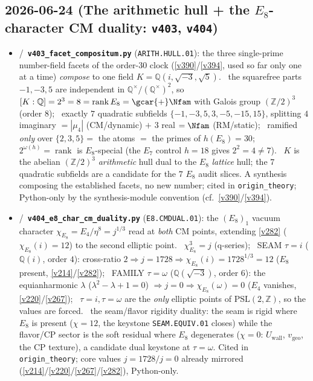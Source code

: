 \subsection*{2026-06-24 (The arithmetic hull + the $E_8$-character CM duality: \texttt{v403}, \texttt{v404})}
\begin{itemize}
\item \mE/\mC\ \textbf{\texttt{v403\_facet\_compositum.py}} (\texttt{ARITH.HULL.01}): the three single-prime number-field facets of the order-$30$ clock (\vref{v390}/\vref{v394}, used so far only one at a time) \emph{compose} to one field $K=\mathbb Q(i,\sqrt{-3},\sqrt5)$. \mE\ the squarefree parts $-1,-3,5$ are independent in $\mathbb Q^\times/(\mathbb Q^\times)^2$, so $[K:\mathbb Q]=2^3=8=\operatorname{rank}E_8=\gcar{+}\Nfam$ with Galois group $(\mathbb Z/2)^3$ (order $8$); \mE\ exactly $7$ quadratic subfields $\{-1,-3,5,3,-5,-15,15\}$, splitting $4$ imaginary $=|\mu_4|$ (CM/dynamic) $+$ $3$ real $=\Nfam$ (RM/static); \mE\ ramified \emph{only} over $\{2,3,5\}=$ the atoms $=$ the primes of $h(E_8)=30$; \mE\ $2^{\omega(h)}=\operatorname{rank}$ is $E_8$-special (the $E_7$ control $h=18$ gives $2^2=4\neq7$). \mC\ $K$ is the abelian $(\mathbb Z/2)^3$ \emph{arithmetic} hull dual to the $E_8$ \emph{lattice} hull; the $7$ quadratic subfields are a candidate for the $7$ $E_8$ audit slices. A synthesis composing the established facets, no new number; cited in \texttt{origin\_theory}; Python-only by the synthesis-module convention (cf.\ \vref{v390}/\vref{v394}).
\item \mE/\mC\ \textbf{\texttt{v404\_e8\_char\_cm\_duality.py}} (\texttt{E8.CMDUAL.01}): the $(E_8)_1$ vacuum character $\chi_{E_8}=E_4/\eta^8=j^{1/3}$ read at \emph{both} CM points, extending \vref{v282} ($\chi_{E_8}(i)=12$) to the second elliptic point. \mE\ $\chi_{E_8}^3=j$ (q-series); \mE\ SEAM $\tau{=}i$ ($\mathbb Q(i)$, order $4$): cross-ratio $2\Rightarrow j=1728\Rightarrow\chi_{E_8}(i)=1728^{1/3}=12$ ($E_8$ present, \vref{v214}/\vref{v282}); \mE\ FAMILY $\tau{=}\omega$ ($\mathbb Q(\sqrt{-3})$, order $6$): the equianharmonic $\lambda$ ($\lambda^2{-}\lambda{+}1=0$) $\Rightarrow j=0\Rightarrow\chi_{E_8}(\omega)=0$ ($E_4$ vanishes, \vref{v220}/\vref{v267}); \mE\ $\tau{=}i,\tau{=}\omega$ are the \emph{only} elliptic points of $\mathrm{PSL}(2,\mathbb Z)$, so the values are forced. \mC\ the seam/flavor rigidity duality: the seam is rigid where $E_8$ is present ($\chi=12$, the keystone \texttt{SEAM.EQUIV.01} closes) while the flavor/CP sector is the soft residual where $E_8$ degenerates ($\chi=0$: $U_{\mathrm{wall}}$, $v_{\mathrm{geo}}$, the CP texture), a candidate dual keystone at $\tau{=}\omega$. Cited in \texttt{origin\_theory}; core values $j=1728/j=0$ already mirrored (\vref{v214}/\vref{v220}/\vref{v267}/\vref{v282}), Python-only.
\end{itemize}

